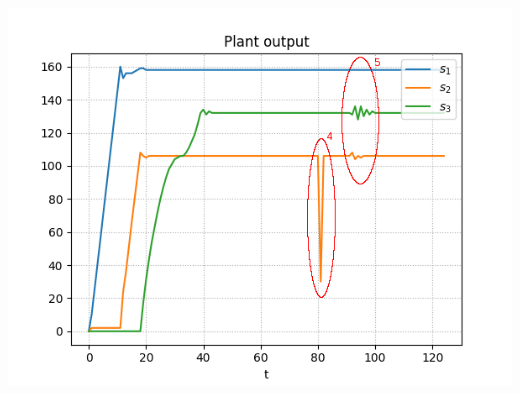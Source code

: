 \documentclass{tikzposter}
\begin{document}
{\begin{minipage}[t]{\linewidth}
			\includegraphics[height=10cm]{./Images/sensors_improved.png}
		\end{minipage}
	}
\end{document}
